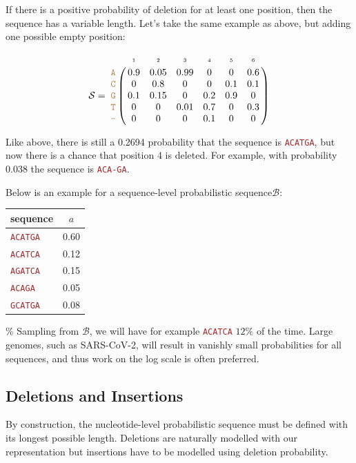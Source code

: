 \documentclass[
]{article}
\newcommand{\sq}[1]{\texttt{\textcolor{brown}{#1}}}
\newcommand{\sps}{\mathcal{B}} %
\newcommand{\nps}{\mathcal{S}} %
\newcommand{\nlps}{nucleotide-level probabilistic sequence\xspace}
\newcommand{\slps}{sequence-level probabilistic sequence\xspace}
\begin{document}
If there is a positive probability of deletion for at least one
position, then the sequence has a variable length. Let's take the same
example as above, but adding one possible empty position:

\[
\nps = 
\bordermatrix{
&\scriptscriptstyle{1} & \scriptscriptstyle{2}& \scriptscriptstyle{3}& \scriptscriptstyle{4} & \scriptscriptstyle{5} & \scriptscriptstyle{6} \cr
\sq{A} & 0.9 & 0.05   & 0.99 & 0 & 0 & 0.6\cr
\sq{C} & 0   & 0.8 & 0 & 0 & 0.1 & 0.1\cr
\sq{G} & 0.1 & 0.15 & 0 & 0.2 & 0.9 & 0\cr
\sq{T} & 0 & 0 & 0.01 & 0.7 & 0 & 0.3\cr
\sq{-} & 0 & 0 & 0 & 0.1 & 0 & 0\cr
}
\]

\noindent Like above, there is still a 0.2694 probability that the
sequence is \sq{ACATGA}, but now there is a chance that position 4 is
deleted. For example, with probability 0.038 the sequence is
\sq{ACA-GA}.

Below is an example for a \slps \(\sps\):

\begin{table}[H]
\begin{center}
\begin{tabular}{lc}
\hline
\textbf{sequence} & $a$ \\
\hline
\sq{ACATGA} & 0.60 \\
\sq{ACATCA} & 0.12 \\
\sq{AGATCA} & 0.15 \\
\sq{ACAGA}  & 0.05 \\
\sq{GCATGA} & 0.08 \\
\hline
\end{tabular}
\end{center}
\label{default}
\end{table}

\% Sampling from \(\sps\), we will have for example \sq{ACATCA} \(12\%\)
of the time. Large genomes, such as SARS-CoV-2, will result in vanishly
small probabilities for all sequences, and thus work on the log scale is
often preferred.

\hypertarget{deletions-and-insertions}{%
\subsection{Deletions and Insertions}\label{deletions-and-insertions}}

By construction, the \nlps must be defined with its longest possible
length. Deletions are naturally modelled with our representation but
insertions have to be modelled using deletion probability.
\end{document}
